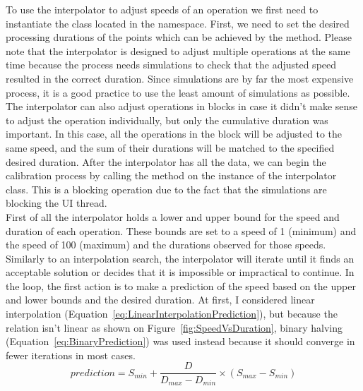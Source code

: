 To use the interpolator to adjust speeds of an operation we first need to instantiate the  class located in the  namespace. First, we need to set the desired processing durations of the points which can be achieved by the  method. Please note that the interpolator is designed to adjust multiple operations at the same time because the process needs simulations to check that the adjusted speed resulted in the correct duration. Since simulations are by far the most expensive process, it is a good practice to use the least amount of simulations as possible. The interpolator can also adjust operations in blocks in case it didn't make sense to adjust the operation individually, but only the cumulative duration was important. In this case, all the operations in the block will be adjusted to the same speed, and the sum of their durations will be matched to the specified desired duration. After the interpolator has all the data, we can begin the calibration process by calling the  method on the instance of the interpolator class. This is a blocking operation due to the fact that the simulations are blocking the UI thread. \\


First of all the interpolator holds a lower and upper bound for the speed and duration of each operation. These bounds are set to a speed of 1 (minimum) and the speed of 100 (maximum) and the durations observed for those speeds. Similarly to an interpolation search, the interpolator will iterate until it finds an acceptable solution or decides that it is impossible or impractical to continue. In the loop, the first action is to make a prediction of the speed based on the upper and lower bounds and the desired duration. At first, I considered linear interpolation (Equation~\ref{eq:LinearInterpolationPrediction}), but because the relation isn't linear as shown on Figure~\ref{fig:SpeedVsDuration}, binary halving (Equation~\ref{eq:BinaryPrediction}) was used instead because it should converge in fewer iterations in most cases. \\

\begin{equation} \label{eq:LinearInterpolationPrediction}
    prediction = S_{min} + \frac{D}{D_{max}-D_{min}} \times (S_{max}-S_{min})
\end{equation}

